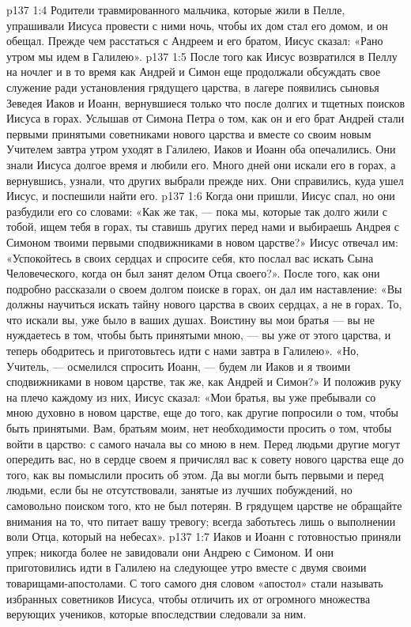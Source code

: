 \vs p137 1:4 \pc Родители травмированного мальчика, которые жили в Пелле, упрашивали Иисуса провести с ними ночь, чтобы их дом стал его домом, и он обещал. Прежде чем расстаться с Андреем и его братом, Иисус сказал: «Рано утром мы идем в Галилею».
\vs p137 1:5 \pc После того как Иисус возвратился в Пеллу на ночлег и в то время как Андрей и Симон еще продолжали обсуждать свое служение ради установления грядущего царства, в лагере появились сыновья Зеведея Иаков и Иоанн, вернувшиеся только что после долгих и тщетных поисков Иисуса в горах. Услышав от Симона Петра о том, как он и его брат Андрей стали первыми принятыми советниками нового царства и вместе со своим новым Учителем завтра утром уходят в Галилею, Иаков и Иоанн оба опечалились. Они знали Иисуса долгое время и любили его. Много дней они искали его в горах, а вернувшись, узнали, что других выбрали прежде них. Они справились, куда ушел Иисус, и поспешили найти его.
\vs p137 1:6 Когда они пришли, Иисус спал, но они разбудили его со словами: «Как же так, --- пока мы, которые так долго жили с тобой, ищем тебя в горах, ты ставишь других перед нами и выбираешь Андрея с Симоном твоими первыми сподвижниками в новом царстве?» Иисус отвечал им: «Успокойтесь в своих сердцах и спросите себя, кто послал вас искать Сына Человеческого, когда он был занят делом Отца своего?». После того, как они подробно рассказали о своем долгом поиске в горах, он дал им наставление: «Вы должны научиться искать тайну нового царства в своих сердцах, а не в горах. То, что искали вы, уже было в ваших душах. Воистину вы мои братья --- вы не нуждаетесь в том, чтобы быть принятыми мною, --- вы уже от этого царства, и теперь ободритесь и приготовьтесь идти с нами завтра в Галилею». «Но, Учитель, --- осмелился спросить Иоанн, --- будем ли Иаков и я твоими сподвижниками в новом царстве, так же, как Андрей и Симон?» И положив руку на плечо каждому из них, Иисус сказал: «Мои братья, вы уже пребывали со мною духовно в новом царстве, еще до того, как другие попросили о том, чтобы быть принятыми. Вам, братьям моим, нет необходимости просить о том, чтобы войти в царство: с самого начала вы со мною в нем. Перед людьми другие могут опередить вас, но в сердце своем я причислял вас к совету нового царства еще до того, как вы помыслили просить об этом. Да вы могли быть первыми и перед людьми, если бы не отсутствовали, занятые из лучших побуждений, но самовольно поиском того, кто не был потерян. В грядущем царстве не обращайте внимания на то, что питает вашу тревогу; всегда заботьтесь лишь о выполнении воли Отца, который на небесах».
\vs p137 1:7 Иаков и Иоанн с готовностью приняли упрек; никогда более не завидовали они Андрею с Симоном. И они приготовились идти в Галилею на следующее утро вместе с двумя своими товарищами\hyp{}апостолами. С того самого дня словом «апостол» стали называть избранных советников Иисуса, чтобы отличить их от огромного множества верующих учеников, которые впоследствии следовали за ним.
